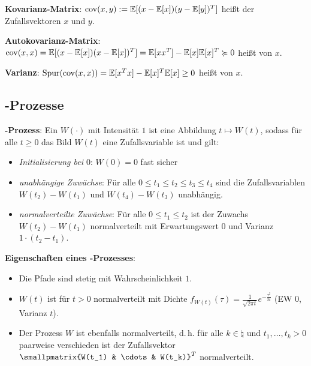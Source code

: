 \textbf{Kovarianz-Matrix}:
$\operatorname{cov}(x, y) := \mathbb{E}[(x - \mathbb{E}[x]) (y - \mathbb{E}[y])^T]$ heißt
 der Zufallsvektoren $x$ und $y$.

\textbf{Autokovarianz-Matrix}:
$\operatorname{cov}(x, x) = \mathbb{E}[(x - \mathbb{E}[x]) (x - \mathbb{E}[x])^T] = \mathbb{E}[xx^T] - \mathbb{E}[x]\mathbb{E}[x]^T \succcurlyeq 0$
heißt  von $x$.

\textbf{Varianz}:
$\operatorname{Spur}(\operatorname{cov}(x, x)) = \mathbb{E}[x^T x] - \mathbb{E}[x]^T \mathbb{E}[x] \ge 0$
heißt  von $x$.

\subsection{%
    -Prozesse%
}

\textbf{-Prozess}:
Ein 
$W(\cdot)$ mit Intensität $1$ ist eine Abbildung $t \mapsto W(t)$,
sodass für alle $t \ge 0$ das Bild $W(t)$ eine Zufallsvariable ist und gilt:
\begin{itemize}
    \item
    \emph{Initialisierung bei $0$}:
    $W(0) = 0$ fast sicher

    \item
    \emph{unabhängige Zuwächse}:
    Für alle $0 \le t_1 \le t_2 \le t_3 \le t_4$ sind die Zufallsvariablen\\
    $W(t_2) - W(t_1)$ und $W(t_4) - W(t_3)$ unabhängig.

    \item
    \emph{normalverteilte Zuwächse}:
    Für alle $0 \le t_1 \le t_2$ ist der Zuwachs $W(t_2) - W(t_1)$ normalverteilt
    mit Erwartungswert $0$ und Varianz $1 \cdot (t_2 - t_1)$.
\end{itemize}

\textbf{Eigenschaften eines -Prozesses}:
\begin{itemize}
    \item
    Die Pfade sind stetig mit Wahrscheinlichkeit $1$.

    \item
    $W(t)$ ist für $t > 0$ normalverteilt mit Dichte
    $f_{W(t)}(\tau) = \frac{1}{\sqrt{2\pi t}} e^{-\frac{\tau^2}{2t}}$
    (EW $0$, Varianz $t$).

    \item
    Der Prozess $W$ ist ebenfalls normalverteilt, d.\,h.
    für alle $k \in \natural$ und $t_1, \dotsc, t_k > 0$ paarweise verschieden ist
    der Zufallsvektor $\smallpmatrix{W(t_1) & \cdots & W(t_k)}^T$ normalverteilt.
\end{itemize}

